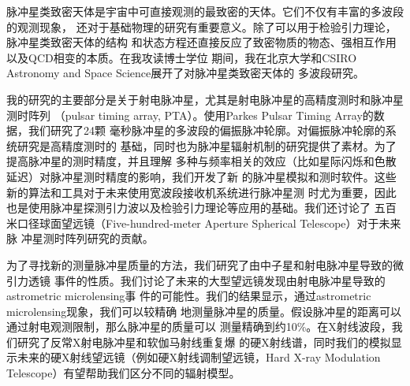 
\begin{cabstract}

脉冲星类致密天体是宇宙中可直接观测的最致密的天体。它们不仅有丰富的多波段的观测现象，
还对于基础物理的研究有重要意义。除了可以用于检验引力理论，脉冲星类致密天体的结构
和状态方程还直接反应了致密物质的物态、强相互作用以及QCD相变的本质。在我攻读博士学位
期间，我在北京大学和CSIRO Astronomy and Space Science展开了对脉冲星类致密天体的
多波段研究。

我的研究的主要部分是关于射电脉冲星，尤其是射电脉冲星的高精度测时和脉冲星测时阵列
（pulsar timing array, PTA）。使用Parkes Pulsar Timing Array的数据，我们研究了24颗
毫秒脉冲星的多波段的偏振脉冲轮廓。对偏振脉冲轮廓的系统研究是高精度测时的
基础，同时也为脉冲星辐射机制的研究提供了素材。为了提高脉冲星的测时精度，并且理解
多种与频率相关的效应（比如星际闪烁和色散延迟）对脉冲星测时精度的影响，我们开发了新
的脉冲星模拟和测时软件。这些新的算法和工具对于未来使用宽波段接收机系统进行脉冲星测
时尤为重要，因此也是使用脉冲星探测引力波以及检验引力理论等应用的基础。我们还讨论了
五百米口径球面望远镜（Five-hundred-meter Aperture Spherical Telescope）对于未来脉
冲星测时阵列研究的贡献。

为了寻找新的测量脉冲星质量的方法，我们研究了由中子星和射电脉冲星导致的微引力透镜
事件的性质。我们讨论了未来的大型望远镜发现由射电脉冲星导致的astrometric microlensing事
件的可能性。我们的结果显示，通过astrometric microlensing现象，我们可以较精确
地测量脉冲星的质量。假设脉冲星的距离可以通过射电观测限制，那么脉冲星的质量可以
测量精确到约10\%。在X射线波段，我们研究了反常X射电脉冲星和软伽马射线重复爆
的硬X射线谱，同时我们的模拟显示未来的硬X射线望远镜（例如硬X射线调制望远镜，Hard 
X-ray Modulation Telescope）有望帮助我们区分不同的辐射模型。
	\pkuthssffaq
\end{cabstract}

